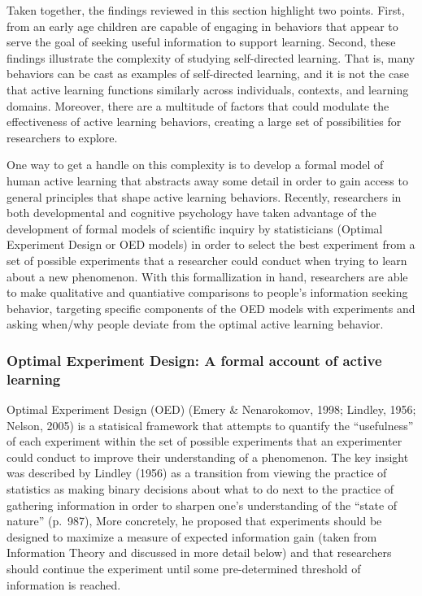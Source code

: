 \documentclass[english,man]{apa6}
\theoremstyle{definition}
\theoremstyle{definition}
\theoremstyle{definition}
\theoremstyle{remark}
\begin{document}
Taken together, the findings reviewed in this section highlight two
points. First, from an early age children are capable of engaging in
behaviors that appear to serve the goal of seeking useful information to
support learning. Second, these findings illustrate the complexity of
studying self-directed learning. That is, many behaviors can be cast as
examples of self-directed learning, and it is not the case that active
learning functions similarly across individuals, contexts, and learning
domains. Moreover, there are a multitude of factors that could modulate
the effectiveness of active learning behaviors, creating a large set of
possibilities for researchers to explore.

One way to get a handle on this complexity is to develop a formal model
of human active learning that abstracts away some detail in order to
gain access to general principles that shape active learning behaviors.
Recently, researchers in both developmental and cognitive psychology
have taken advantage of the development of formal models of scientific
inquiry by statisticians (Optimal Experiment Design or OED models) in
order to select the best experiment from a set of possible experiments
that a researcher could conduct when trying to learn about a new
phenomenon. With this formallization in hand, researchers are able to
make qualitative and quantiative comparisons to people's information
seeking behavior, targeting specific components of the OED models with
experiments and asking when/why people deviate from the optimal active
learning behavior.

\subsubsection{Optimal Experiment Design: A formal account of active
learning}\label{optimal-experiment-design-a-formal-account-of-active-learning}

Optimal Experiment Design (OED) (Emery \& Nenarokomov, 1998; Lindley,
1956; Nelson, 2005) is a statisical framework that attempts to quantify
the \enquote{usefulness} of each experiment within the set of possible
experiments that an experimenter could conduct to improve their
understanding of a phenomenon. The key insight was described by Lindley
(1956) as a transition from viewing the practice of statistics as making
binary decisions about what to do next to the practice of gathering
information in order to sharpen one's understanding of the
\enquote{state of nature} (p.~987), More concretely, he proposed that
experiments should be designed to maximize a measure of expected
information gain (taken from Information Theory and discussed in more
detail below) and that researchers should continue the experiment until
some pre-determined threshold of information is reached.
\end{document}
